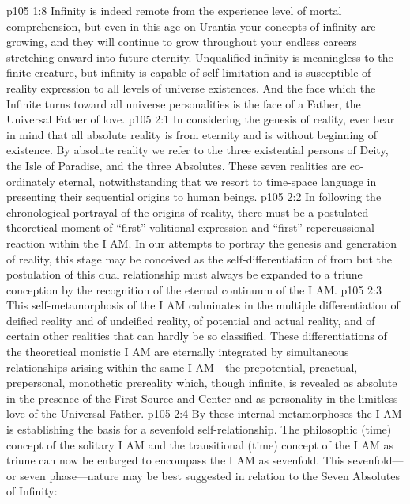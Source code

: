 \vs p105 1:8 Infinity is indeed remote from the experience level of mortal comprehension, but even in this age on Urantia your concepts of infinity are growing, and they will continue to grow throughout your endless careers stretching onward into future eternity. Unqualified infinity is meaningless to the finite creature, but infinity is capable of self\hyp{}limitation and is susceptible of reality expression to all levels of universe existences. And the face which the Infinite turns toward all universe personalities is the face of a Father, the Universal Father of love.
\vs p105 2:1 In considering the genesis of reality, ever bear in mind that all absolute reality is from eternity and is without beginning of existence. By absolute reality we refer to the three existential persons of Deity, the Isle of Paradise, and the three Absolutes. These seven realities are co\hyp{}ordinately eternal, notwithstanding that we resort to time\hyp{}space language in presenting their sequential origins to human beings.
\pc \vs p105 2:2 In following the chronological portrayal of the origins of reality, there must be a postulated theoretical moment of “first” volitional expression and “first” repercussional reaction within the I AM. In our attempts to portray the genesis and generation of reality, this stage may be conceived as the self\hyp{}differentiation of  from  but the postulation of this dual relationship must always be expanded to a triune conception by the recognition of the eternal continuum of  the I AM.
\vs p105 2:3 This self\hyp{}metamorphosis of the I AM culminates in the multiple differentiation of deified reality and of undeified reality, of potential and actual reality, and of certain other realities that can hardly be so classified. These differentiations of the theoretical monistic I AM are eternally integrated by simultaneous relationships arising within the same I AM---the prepotential, preactual, prepersonal, monothetic prereality which, though infinite, is revealed as absolute in the presence of the First Source and Center and as personality in the limitless love of the Universal Father.
\vs p105 2:4 By these internal metamorphoses the I AM is establishing the basis for a sevenfold self\hyp{}relationship. The philosophic (time) concept of the solitary I AM and the transitional (time) concept of the I AM as triune can now be enlarged to encompass the I AM as sevenfold. This sevenfold---or seven phase---nature may be best suggested in relation to the Seven Absolutes of Infinity:

